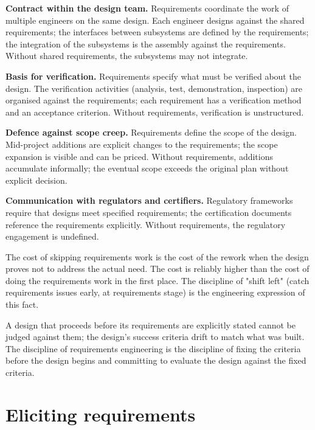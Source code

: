 \textbf{Contract within the design team.} Requirements coordinate the work of multiple engineers on the same design. Each engineer designs against the shared requirements; the interfaces between subsystems are defined by the requirements; the integration of the subsystems is the assembly against the requirements. Without shared requirements, the subsystems may not integrate.

\textbf{Basis for verification.} Requirements specify what must be verified about the design. The verification activities (analysis, test, demonstration, inspection) are organised against the requirements; each requirement has a verification method and an acceptance criterion. Without requirements, verification is unstructured.

\textbf{Defence against scope creep.} Requirements define the scope of the design. Mid-project additions are explicit changes to the requirements; the scope expansion is visible and can be priced. Without requirements, additions accumulate informally; the eventual scope exceeds the original plan without explicit decision.

\textbf{Communication with regulators and certifiers.} Regulatory frameworks require that designs meet specified requirements; the certification documents reference the requirements explicitly. Without requirements, the regulatory engagement is undefined.

The cost of skipping requirements work is the cost of the rework when the design proves not to address the actual need. The cost is reliably higher than the cost of doing the requirements work in the first place. The discipline of "shift left" (catch requirements issues early, at requirements stage) is the engineering expression of this fact.

\begin{principle}
A design that proceeds before its requirements are explicitly stated cannot be judged against them; the design's success criteria drift to match what was built. The discipline of requirements engineering is the discipline of fixing the criteria before the design begins and committing to evaluate the design against the fixed criteria.
\end{principle}

\section{Eliciting requirements}

